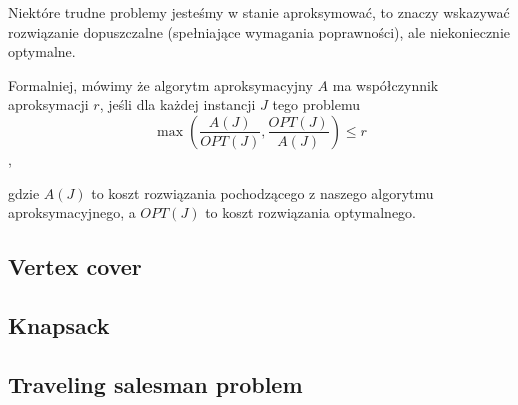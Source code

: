 Niektóre trudne problemy jesteśmy w stanie aproksymować, to znaczy wskazywać rozwiązanie dopuszczalne (spełniające wymagania poprawności), ale niekoniecznie optymalne.

Formalniej, mówimy że algorytm aproksymacyjny $A$ ma współczynnik aproksymacji $r$, jeśli dla każdej instancji $J$ tego problemu
\[
\max\left(\frac{A(J)}{OPT(J)}, \frac{OPT(J)}{A(J)}\right) \leqslant r
\],

gdzie $A(J)$ to koszt rozwiązania pochodzącego z naszego algorytmu aproksymacyjnego, a $OPT(J)$ to koszt rozwiązania optymalnego.

\subsection{Vertex cover}


\subsection{Knapsack}


\subsection{Traveling salesman problem}
